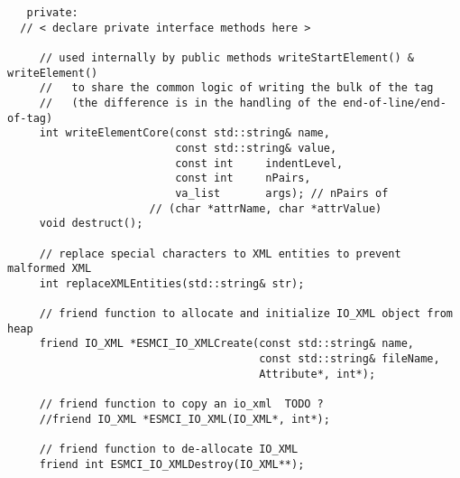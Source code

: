 \begin{verbatim}   private:
  // < declare private interface methods here >
 
     // used internally by public methods writeStartElement() & writeElement()
     //   to share the common logic of writing the bulk of the tag
     //   (the difference is in the handling of the end-of-line/end-of-tag)
     int writeElementCore(const std::string& name,
                          const std::string& value,
                          const int     indentLevel,
                          const int     nPairs,
                          va_list       args); // nPairs of
                      // (char *attrName, char *attrValue)
     void destruct();
 
     // replace special characters to XML entities to prevent malformed XML
     int replaceXMLEntities(std::string& str);
 
     // friend function to allocate and initialize IO_XML object from heap
     friend IO_XML *ESMCI_IO_XMLCreate(const std::string& name,
                                       const std::string& fileName,
                                       Attribute*, int*);
 
     // friend function to copy an io_xml  TODO ?
     //friend IO_XML *ESMCI_IO_XML(IO_XML*, int*);
 
     // friend function to de-allocate IO_XML
     friend int ESMCI_IO_XMLDestroy(IO_XML**);
 \end{verbatim}

\setlength{\parskip}{\oldparskip}
\setlength{\parindent}{\oldparindent}
\setlength{\baselineskip}{\oldbaselineskip}
